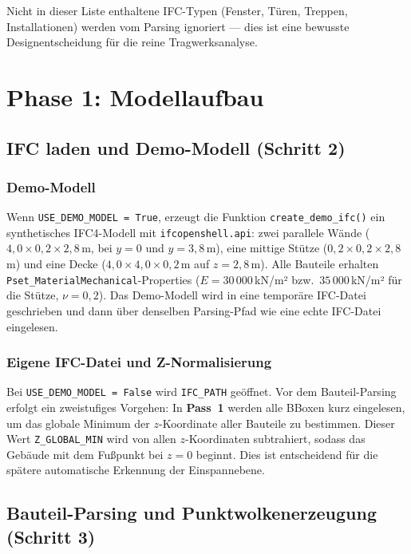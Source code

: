 \documentclass[a4paper,11pt]{article}
\begin{document}
Nicht in dieser Liste enthaltene IFC-Typen (Fenster, Türen, Treppen, Installationen) werden vom Parsing ignoriert — dies ist eine bewusste Designentscheidung für die reine Tragwerksanalyse.

\section{Phase 1: Modellaufbau}

\subsection{IFC laden und Demo-Modell (Schritt 2)}

\subsubsection{Demo-Modell}

Wenn \texttt{USE\_DEMO\_MODEL = True}, erzeugt die Funktion \texttt{create\_demo\_ifc()} ein synthetisches IFC4-Modell mit \texttt{ifcopenshell.api}: zwei parallele Wände ($4{,}0 \times 0{,}2 \times 2{,}8$\,m, bei $y = 0$ und $y = 3{,}8$\,m), eine mittige Stütze ($0{,}2 \times 0{,}2 \times 2{,}8$\,m) und eine Decke ($4{,}0 \times 4{,}0 \times 0{,}2$\,m auf $z = 2{,}8$\,m). Alle Bauteile erhalten \texttt{Pset\_MaterialMechanical}-Properties ($E = 30\,000$\,kN/m² bzw.\ $35\,000$\,kN/m² für die Stütze, $\nu = 0{,}2$). Das Demo-Modell wird in eine temporäre IFC-Datei geschrieben und dann über denselben Parsing-Pfad wie eine echte IFC-Datei eingelesen.

\subsubsection{Eigene IFC-Datei und Z-Normalisierung}

Bei \texttt{USE\_DEMO\_MODEL = False} wird \texttt{IFC\_PATH} geöffnet. Vor dem Bauteil-Parsing erfolgt ein zweistufiges Vorgehen: In \textbf{Pass~1} werden alle BBoxen kurz eingelesen, um das globale Minimum der $z$-Koordinate aller Bauteile zu bestimmen. Dieser Wert \texttt{Z\_GLOBAL\_MIN} wird von allen $z$-Koordinaten subtrahiert, sodass das Gebäude mit dem Fußpunkt bei $z = 0$ beginnt. Dies ist entscheidend für die spätere automatische Erkennung der Einspannebene.

\subsection{Bauteil-Parsing und Punktwolkenerzeugung (Schritt 3)}
\end{document}
